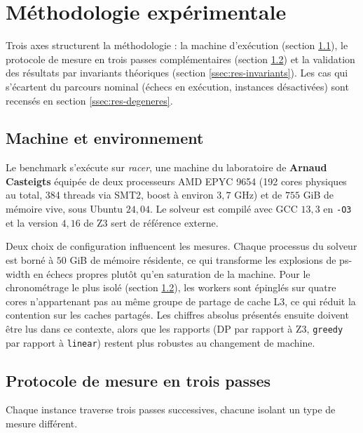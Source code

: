 \documentclass[11pt,a4paper]{report}
\theoremstyle{plain}
\theoremstyle{definition}
\begin{document}
\section{Méthodologie expérimentale}
\label{sec:res-methodo}

Trois axes structurent la méthodologie : la machine d'exécution
(section \ref{ssec:res-machine}), le protocole de mesure en trois
passes complémentaires (section \ref{ssec:res-protocole}) et la
validation des résultats par invariants théoriques
(section \ref{ssec:res-invariants}). Les cas qui s'écartent du
parcours nominal (échecs en exécution, instances désactivées) sont
recensés en section \ref{ssec:res-degeneres}.

\subsection{Machine et environnement}
\label{ssec:res-machine}

Le benchmark s'exécute sur \emph{racer}, une machine du laboratoire de \textbf{Arnaud Casteigts}
équipée de deux processeurs AMD EPYC 9654 (192 cores physiques au
total, 384 threads via SMT2, boost à environ $3{,}7$ GHz) et de
$755$ GiB de mémoire vive, sous Ubuntu $24{,}04$. Le solveur est
compilé avec GCC $13{,}3$ en \texttt{-O3} et la version $4{,}16$ de
Z3 sert de référence externe.

Deux choix de configuration influencent les mesures. Chaque
processus du solveur est borné à $50$ GiB de mémoire résidente, ce
qui transforme les explosions de ps-width en échecs propres plutôt
qu'en saturation de la machine. Pour le chronométrage le plus
isolé (section \ref{ssec:res-protocole}), les workers sont
épinglés sur quatre cores n'appartenant pas au même groupe de
partage de cache L3, ce qui réduit la contention sur les caches
partagés. Les chiffres absolus présentés ensuite doivent être lus
dans ce contexte, alors que les rapports (DP par rapport à Z3,
\texttt{greedy} par rapport à \texttt{linear}) restent plus
robustes au changement de machine.

\subsection{Protocole de mesure en trois passes}
\label{ssec:res-protocole}

Chaque instance traverse trois passes successives, chacune isolant
un type de mesure différent.
\end{document}
